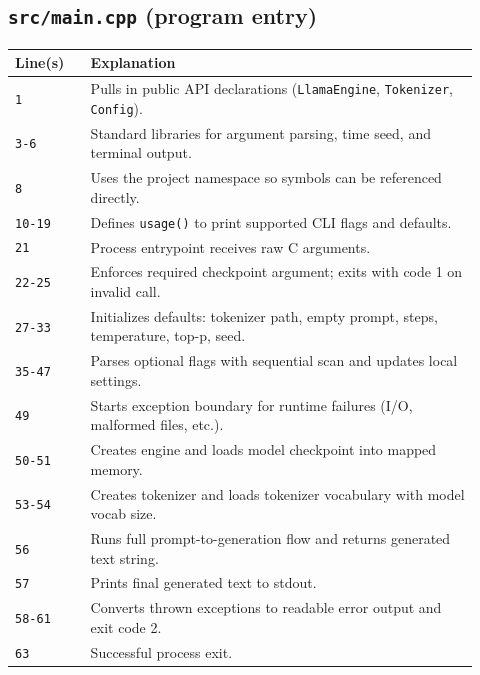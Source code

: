 \documentclass[11pt]{article}
\begin{document}
\subsection{\texttt{src/main.cpp} (program entry)}
\begin{longtable}{p{0.15\linewidth} p{0.77\linewidth}}
\toprule
\textbf{Line(s)} & \textbf{Explanation} \\
\midrule
\endhead
\texttt{1} & Pulls in public API declarations (\texttt{LlamaEngine}, \texttt{Tokenizer}, \texttt{Config}). \\
\texttt{3-6} & Standard libraries for argument parsing, time seed, and terminal output. \\
\texttt{8} & Uses the project namespace so symbols can be referenced directly. \\
\texttt{10-19} & Defines \texttt{usage()} to print supported CLI flags and defaults. \\
\texttt{21} & Process entrypoint receives raw C arguments. \\
\texttt{22-25} & Enforces required checkpoint argument; exits with code 1 on invalid call. \\
\texttt{27-33} & Initializes defaults: tokenizer path, empty prompt, steps, temperature, top-p, seed. \\
\texttt{35-47} & Parses optional flags with sequential scan and updates local settings. \\
\texttt{49} & Starts exception boundary for runtime failures (I/O, malformed files, etc.). \\
\texttt{50-51} & Creates engine and loads model checkpoint into mapped memory. \\
\texttt{53-54} & Creates tokenizer and loads tokenizer vocabulary with model vocab size. \\
\texttt{56} & Runs full prompt-to-generation flow and returns generated text string. \\
\texttt{57} & Prints final generated text to stdout. \\
\texttt{58-61} & Converts thrown exceptions to readable error output and exit code 2. \\
\texttt{63} & Successful process exit. \\
\bottomrule
\end{longtable}
\end{document}
